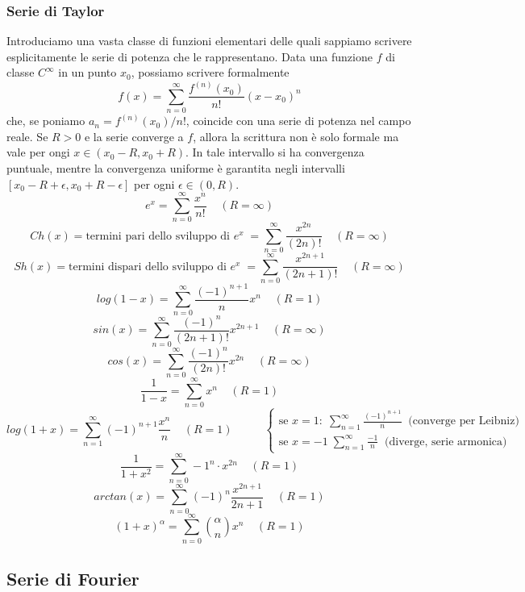 \subsubsection{Serie di Taylor}\newline
Introduciamo una vasta classe di funzioni elementari delle quali sappiamo scrivere esplicitamente le serie di potenza che le rappresentano.\newline
Data una funzione $f$ di classe $C^\infty$ in un punto $x_0$, possiamo scrivere formalmente
\[
    f(x) = \sum_{n=0}^{\infty} \frac{f^{(n)}(x_0)}{n!}(x-x_0)^n
\]
che, se poniamo $a_n = f^{(n)}(x_0)/n!$, coincide con una serie di potenza nel campo reale. Se $R > 0$ e la serie converge a $f$, allora la scrittura non è solo formale ma vale per ongi $x \in (x_0 - R, x_0 + R)$. In tale intervallo si ha convergenza puntuale, mentre la convergenza uniforme è garantita negli intervalli $[x_0 - R + \epsilon, x_0 + R -\epsilon]$ per ogni $\epsilon \in (0,R)$.
\[
    e^x = \sum_{n=0}^{\infty} \frac{x^n}{n!} \;\;\;\; (R= \infty)
\]
\[
    Ch(x) = \text{termini pari dello sviluppo di $e^x$}\;= \sum_{n=0}^{\infty} \frac{x^{2n}}{(2n)!} \;\;\;\; (R= \infty)
\]
\[
    Sh(x) = \text{termini dispari dello sviluppo di $e^x$}\;=  \sum_{n=0}^{\infty} \frac{x^{2n+1}}{(2n+1)!} \;\;\;\; (R= \infty)
\]
\[
    log(1-x) = \sum_{n=0}^{\infty} \frac{(-1)^{n+1}}{n} x^n\;\;\;\; (R=1)
\]
\[
    sin(x) = \sum_{n=0}^{\infty} \frac{(-1)^n}{(2n+1)!} x^{2n+1}\;\;\;\; (R= \infty)
\]
\[
    cos(x) = \sum_{n=0}^{\infty} \frac{(-1)^n}{(2n)!}x^{2n}\;\;\;\; (R= \infty)
\]
\[
    \frac{1}{1-x} = \sum_{n=0}^{\infty} x^n\;\;\;\; (R= 1)
\]
\[
    log(1+x) = \sum_{n=1}^{\infty} (-1)^{n+1} \frac{x^n}{n}\;\;\;\; (R= 1)\;\;\;\;\;\;\;\;\;\;\begin{cases}
        \text{se $x=1: $}\; \sum_{n=1}^{\infty}\frac{(-1)^{n+1}}{n} \;\;\text{(converge per Leibniz)}\;\\
        \text{se $x=-1$}\; \sum_{n=1}^{\infty}\frac{-1}{n} \;\;\text{(diverge, serie armonica)}\;
    \end{cases}
\]
\[
    \frac{1}{1+x^2} = \sum_{n=0}^{\infty} -1^n \cdot x^{2n} \;\;\;\;(R=1)
\]
\[
    arctan(x) = \sum_{n=0}^{\infty}(-1)^n \frac{x^{2n+1}}{2n+1} \;\;\;\;(R=1)
\]
\[
    (1+x)^\alpha = \sum_{n=0}^{\infty} \binom{\alpha}{n}x^n \;\;\;\; (R=1)
\]
\subsection{Serie di Fourier}
